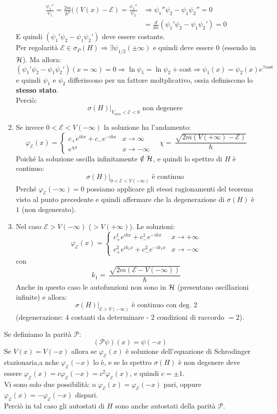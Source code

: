 \documentclass[../../FisicaTeorica.tex]{subfiles}
\begin{document}
\begin{enumerate}
\begin{align*}
\frac{\psi_1''}{\psi_1}=\frac{2m}{\hbar^2}((V(x)-\mathcal{E})=\frac{\psi_2''}{\psi_2} &\Rightarrow \psi_1''\psi_2 - \psi_1\psi_2'' = 0\\
&= \frac{d}{dx}(\psi_1' \psi_2 - \psi_1 \psi_2') = 0
\end{align*}
E quindi $(\psi_1'\psi_2 - \psi_1 \psi_2')$ deve essere costante.\\
Per regolarità $\mathcal{E}\in \sigma_P(H) \Rightarrow  \exists \psi_{1/2}(\pm\infty)$ e quindi deve essere $0$ (essendo in $\mathcal{H}$). Ma allora:
\[
(\psi_1' \psi_2 - \psi_1 \psi_2')(x=\infty)=0\Rightarrow \ln \psi_1 = \ln \psi_2 + \text{cost} \Rightarrow \psi_1(x)=\psi_2(x)e^{?\text{cost}}
\]
e quindi $\psi_1$ e $\psi_2$ differiscono per un fattore moltplicativo, ossia definiscono lo \textbf{stesso stato}.\\
Perciò:
\[
\sigma(H)\Big|_{V_{min} < \mathcal{E} < 0} \text{ non degenere }
\]
\item Se invece $0 < \mathcal{E} < V(-\infty)$ la soluzione ha l'andamento:
\[
\varphi_\mathcal{E}(x) = \begin{cases}
c_+ e^{ikx} + c_-e^{-ikx} & x\to\infty\\
e^{\chi x} & x\to-\infty
\end{cases} \quad \chi =\ \frac{\sqrt{2m(V(+\infty)-\mathcal{E})}}{\hbar}
\]
Poiché la soluzione oscilla infinitamente $\notin \mathcal{H}$, e quindi lo spettro di $H$ è continuo:
\[
\sigma(H)\Big|_{0<\mathcal{E}<V(-\infty)} \text{ è continuo }
\]
Perché $\varphi_\mathcal{E}(-\infty) = 0$ possiamo applicare gli stessi ragionamenti del teorema visto al punto precedente e quindi affermare che la degenerazione di $\sigma(H)$ è $1$ (non degenerato).
\item Nel caso $\mathcal{E} > V(-\infty)$ ($> V(+\infty)$). Le soluzioni:
\[
\varphi_\mathcal{E}(x) = \begin{cases}
c^1_+ e^{ikx} + c^1_- e^{-ikx} & x\to +\infty\\
c^2_+ e^{ik_1 x} + c^2_- e^{-ik_1 x} & x\to -\infty
\end{cases}
\]
con
\[
k_1 =\ \frac{\sqrt{2m(\mathcal{E}-V(-\infty))}}{\hbar}
\]
Anche in questo caso le autofunzioni non sono in $\mathcal{H}$ (presentano oscillazioni infinite) e allora:
\[
\sigma(H)\Big|_{\mathcal{E}>V(-\infty)} \text{ è continuo con deg. 2}
\]
(degenerazione: $4$ costanti da determinare - $2$ condizioni di raccordo $= 2$).
\end{enumerate}
Se definiamo la parità $\mathcal{P}$:
\[
(\mathcal{P}\psi)(x)=\psi(-x)
\]
Se $V(x)=V(-x)$ allora se $\varphi_\mathcal{E}(x)$ è soluzione dell'equazione di Schrodinger stazionaria,a nche $\varphi_\mathcal{E}(-x)$ lo è, e se lo spettro $\sigma(H)$ è non degenere deve essere $\varphi_\mathcal{E}(x)=c \varphi_\mathcal{E}(-x) = c^2\varphi_\mathcal{E}(x)$, e quindi $c=\pm 1$.\\
Vi sono solo due possibilità: o $\varphi_\mathcal{E}(x) =\varphi_\mathcal{E}(-x)$ pari, oppure $\varphi_\mathcal{E}(x)=-\varphi_\mathcal{E}(-x)$ dispari.\\
Perciò in tal caso gli autostati di $H$ sono anche autostati della parità $\mathcal{P}$.
\end{document}

